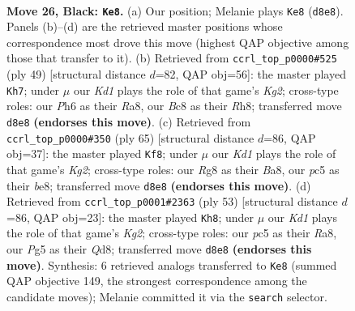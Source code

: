 \documentclass[11pt]{article}
\begin{document}
\clearpage

\begin{figure}[p]\centering
\begin{subfigure}{0.46\textwidth}\centering
\resizebox{\linewidth}{!}{%
\newchessgame
\chessboard[
  setfen={1rbk2r1/p1p2p2/2p1p2p/2P3p1/3Q4/3B4/P6q/R2KR3 b - - 2 26},
  showmover=false,
  pgfstyle=straightmove, color=movearrow, markmove={d8-e8}
]}
\caption{}
\end{subfigure}\hfill
\begin{subfigure}{0.46\textwidth}\centering
\resizebox{\linewidth}{!}{%
\newchessgame
\chessboard[
  setfen={r6r/1p1q2k1/p2pb1p1/3p3p/3Q1P2/8/PP2B1PP/2R1R1K1 b - - 1 25},
  showmover=false,
  pgfstyle=straightmove, color=movearrow, markmove={g7-h7}
]}
\caption{}
\end{subfigure}
\\[4pt]
\begin{subfigure}{0.46\textwidth}\centering
\resizebox{\linewidth}{!}{%
\newchessgame
\chessboard[
  setfen={b3B3/q4pk1/r2b4/p2p1pQ1/1p6/7P/PP3P2/4RK2 b - - 0 33},
  showmover=false,
  pgfstyle=straightmove, color=movearrow, markmove={g7-f8}
]}
\caption{}
\end{subfigure}\hfill
\begin{subfigure}{0.46\textwidth}\centering
\resizebox{\linewidth}{!}{%
\newchessgame
\chessboard[
  setfen={r2q4/2p2Rkp/1pp3p1/p3b3/P1Q5/3PB2P/6P1/6K1 b - - 3 27},
  showmover=false,
  pgfstyle=straightmove, color=movearrow, markmove={g7-h8}
]}
\caption{}
\end{subfigure}
\caption{\textbf{Move 26, Black: \texttt{Ke8}.} (a) Our position; Melanie plays \texttt{Ke8} (\texttt{d8e8}). Panels (b)--(d) are the retrieved master positions whose correspondence most drove this move (highest QAP objective among those that transfer to it). (b) Retrieved from \texttt{ccrl\_top\_p0000\#525} (ply 49) [structural distance $d$=82, QAP obj=56]: the master played \texttt{Kh7}; under $\mu$ our \emph{Kd1} plays the role of that game's \emph{Kg2}; cross-type roles: our \emph{P}h6 as their \emph{R}a8, our \emph{B}c8 as their \emph{R}h8; transferred move \texttt{d8e8} \textbf{(endorses this move)}. (c) Retrieved from \texttt{ccrl\_top\_p0000\#350} (ply 65) [structural distance $d$=86, QAP obj=37]: the master played \texttt{Kf8}; under $\mu$ our \emph{Kd1} plays the role of that game's \emph{Kg2}; cross-type roles: our \emph{R}g8 as their \emph{B}a8, our \emph{p}c5 as their \emph{b}e8; transferred move \texttt{d8e8} \textbf{(endorses this move)}. (d) Retrieved from \texttt{ccrl\_top\_p0001\#2363} (ply 53) [structural distance $d$=86, QAP obj=23]: the master played \texttt{Kh8}; under $\mu$ our \emph{Kd1} plays the role of that game's \emph{Kg2}; cross-type roles: our \emph{p}c5 as their \emph{R}a8, our \emph{P}g5 as their \emph{Q}d8; transferred move \texttt{d8e8} \textbf{(endorses this move)}. Synthesis: 6 retrieved analogs transferred to \texttt{Ke8} (summed QAP objective 149, the strongest correspondence among the candidate moves); Melanie committed it via the \texttt{search} selector.}
\label{fig:thought-m51}
\end{figure}
\end{document}
